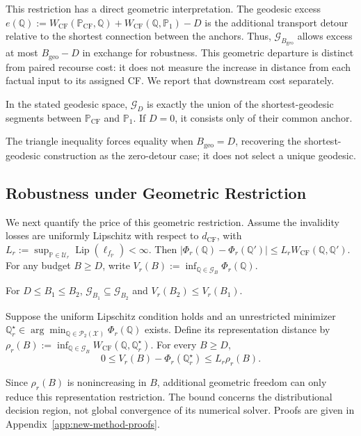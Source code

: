 This restriction has a direct geometric interpretation.
The geodesic excess $e(\mathbb Q):=W_{\mathrm{CF}}(\mathbb P_{\mathrm{CF}},\mathbb Q)+W_{\mathrm{CF}}(\mathbb Q,\mathbb P_1)-D$ is the additional transport detour relative to the shortest connection between the anchors.
Thus, $\mathcal G_{B_{\mathrm{geo}}}$ allows excess at most $B_{\mathrm{geo}}-D$ in exchange for robustness.
This geometric departure is distinct from paired recourse cost: it does not measure the increase in distance from each factual input to its assigned CF.
We report that downstream cost separately.

\begin{proposition}
\label{prop:new-zero-detour}
In the stated geodesic space, $\mathcal G_D$ is exactly the union of the shortest-geodesic segments between $\mathbb P_{\mathrm{CF}}$ and $\mathbb P_1$.
If $D=0$, it consists only of their common anchor.
\end{proposition}
The triangle inequality forces equality when $B_{\mathrm{geo}}=D$, recovering the shortest-geodesic construction as the zero-detour case; it does not select a unique geodesic.

\subsection{Robustness under Geometric Restriction}
\label{sec:new-theory}

We next quantify the price of this geometric restriction.
Assume the invalidity losses are uniformly Lipschitz with respect to $d_{\mathrm{CF}}$, with $L_r:=\sup_{\mathbb P\in\mathcal U_r}\operatorname{Lip}(\ell_{f_{\mathbb P}})<\infty$.
Then $|\Phi_r(\mathbb Q)-\Phi_r(\mathbb Q')|\le L_rW_{\mathrm{CF}}(\mathbb Q,\mathbb Q')$.
For any budget $B\ge D$, write $V_r(B):=\inf_{\mathbb Q\in\mathcal G_B}\Phi_r(\mathbb Q)$.

\begin{corollary}
\label{cor:new-nested}
For $D\le B_1\le B_2$, $\mathcal G_{B_1}\subseteq\mathcal G_{B_2}$ and $V_r(B_2)\le V_r(B_1)$.
\end{corollary}

\begin{theorem}
\label{thm:new-restriction}
Suppose the uniform Lipschitz condition holds and an unrestricted minimizer $\mathbb Q_r^\star\in\arg\min_{\mathbb Q\in\mathcal P_2(\mathcal X)}\Phi_r(\mathbb Q)$ exists.
Define its representation distance by $\rho_r(B):=\inf_{\mathbb Q\in\mathcal G_B}W_{\mathrm{CF}}(\mathbb Q,\mathbb Q_r^\star)$.
For every $B\ge D$,
\begin{equation}
0\le V_r(B)-\Phi_r(\mathbb Q_r^\star)\le L_r\rho_r(B).
\label{eq:new-restriction-bound}
\end{equation}
\end{theorem}
Since $\rho_r(B)$ is nonincreasing in $B$, additional geometric freedom can only reduce this representation restriction.
The bound concerns the distributional decision region, not global convergence of its numerical solver.
Proofs are given in Appendix~\ref{app:new-method-proofs}.

